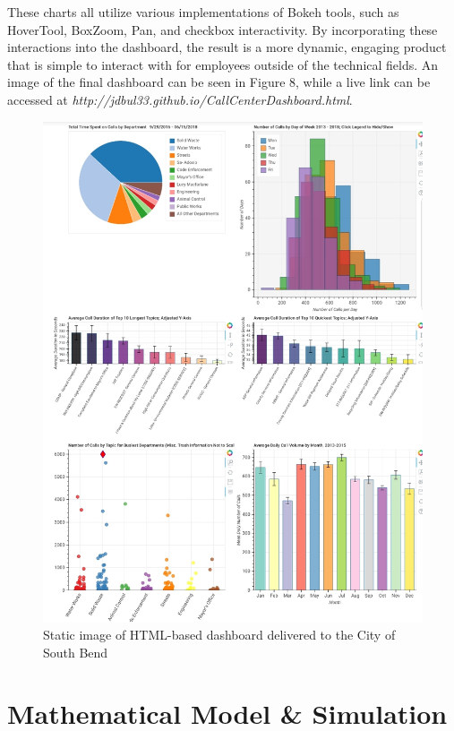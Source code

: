 \documentclass[12pt]{article}
\begin{document}
These charts all utilize various implementations of Bokeh tools, such as HoverTool, BoxZoom, Pan, and checkbox interactivity.  By incorporating these interactions into the dashboard, the result is a more dynamic, engaging product that is simple to interact with for employees outside of the technical fields.  An image of the final dashboard can be seen in Figure 8, while a live link can be accessed at \textit{http://jdbul33.github.io/CallCenterDashboard.html}.

	\begin{figure}
	\includegraphics[scale=.4]{Dashboard.jpg}
	\caption{Static image of HTML-based dashboard delivered to the City of South Bend}
	\end{figure}



\section{Mathematical Model \& Simulation}
\end{document}
